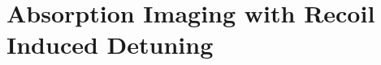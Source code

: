 \renewcommand{\thechapter}{4}

\chapter{Absorption Imaging with Recoil Induced Detuning}\label{AbsorptionImagingChapter}

